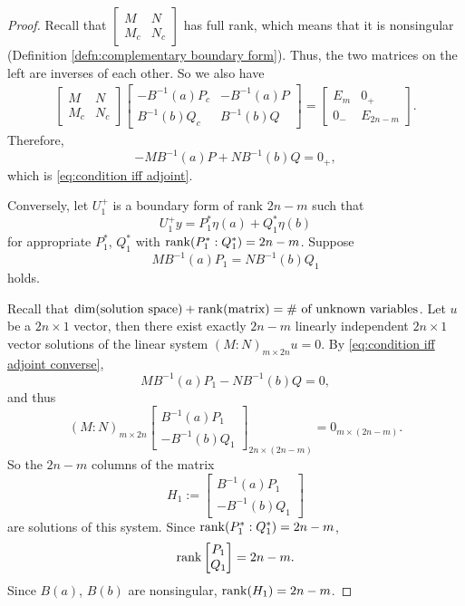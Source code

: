 \documentclass[10.5pt, oneside, a4paper]{article}
\begin{document}
\begin{proof}
{    Recall that $\begin{bmatrix}
        M & N\\
        M_c & N_c
    \end{bmatrix}$ has full rank, which means that it is nonsingular (Definition \ref{defn:complementary boundary form}). Thus, the two matrices on the left are inverses of each other. So we also have
    }
    \begin{align*}
        \begin{bmatrix}
            M & N\\
            M_c & N_c
        \end{bmatrix}
        \begin{bmatrix}
            -B^{-1}(a)P_c & -B^{-1}(a)P\\
            B^{-1}(b)Q_c & B^{-1}(b)Q
        \end{bmatrix}
        =
        \begin{bmatrix}
            E_m & 0_+\\
            0_- & E_{2n-m}
        \end{bmatrix}.
    \end{align*}
    Therefore,
    \[-MB^{-1}(a)P + NB^{-1}(b)Q = 0_+,\]
    which is \eqref{eq:condition iff adjoint}.

    Conversely, let $U_1^+$ is a boundary form of rank $2n-m$ such that
    \[U_1^+y = P_1^*\eta(a) + Q_1^*\eta(b)\]
    for appropriate $P_1^*$, $Q_1^*$ with $\operatorname{rank}(P_1^*:Q_1^*)=2n-m$. Suppose
    \begin{equation}\label{eq:condition iff adjoint converse}
        MB^{-1}(a)P_1 = NB^{-1}(b)Q_1
    \end{equation}
    holds.

    {\color{blue}
    Recall that $\dim(\text{solution space}) + \operatorname{rank}(\text{matrix}) = \text{$\#$ of unknown variables}$. Let $u$ be a $2n\times 1$ vector, then there exist exactly $2n-m$ linearly independent $2n\times 1$ vector solutions of the linear system $(M:N)_{m\times 2n}u=0$. By \eqref{eq:condition iff adjoint converse},
    \[MB^{-1}(a)P_1 - NB^{-1}(b)Q=0,\]
    and thus
    \[(M:N)_{m\times 2n}\begin{bmatrix}
        B^{-1}(a)P_1\\
        -B^{-1}(b)Q_1
    \end{bmatrix}_{2n\times (2n-m)} = 0_{m\times (2n-m)}.\]
    }
    So the $2n-m$ columns of the matrix
    \[H_1:= \begin{bmatrix}
        B^{-1}(a)P_1\\
        -B^{-1}(b)Q_1
    \end{bmatrix}\]
    are solutions of this system. Since $\operatorname{rank}(P_1^*:Q_1^*)=2n-m$,
    \[\operatorname{rank}\begin{bmatrix}P_1\\ Q_1\end{bmatrix}=2n-m.\]
    Since $B(a)$, $B(b)$ are nonsingular, $\operatorname{rank}(H_1)=2n-m$.


\end{proof}
\end{document}
